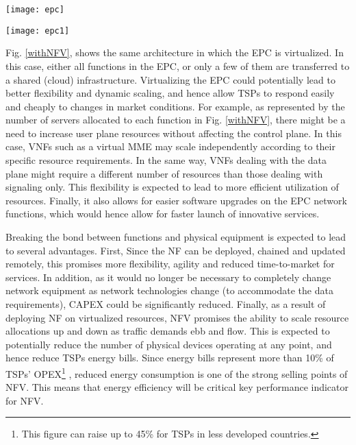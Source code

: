 \documentclass[conference]{IEEEtran}
\begin{document}
 \begin{figure*}[t]
\begin{minipage}{.50\textwidth}
\centering
\resizebox{.95\textwidth}{!}
{\texttt{[image: epc]}}
  \caption{Traditional \ac{LTE} \ac{EPC}}
  \label{current}
\end{minipage}
\begin{minipage}{.50\textwidth}
\centering
\resizebox{.95\textwidth}{!}
{\texttt{[image: epc1]}}
  \caption{Possible Virtualized \ac{EPC} Implementation}
  \label{withNFV}
\end{minipage}
\end{figure*}

Fig. \ref{withNFV}, shows the same architecture in which the \ac{EPC} is virtualized. In this case, either all functions in the EPC, or only a few of them are transferred to a shared (cloud) infrastructure. Virtualizing the \ac{EPC} could potentially lead to better flexibility and dynamic scaling, and hence allow \acp{TSP} to respond easily and cheaply to changes in market conditions. For example, as represented by the number of servers allocated to each function in Fig. \ref{withNFV}, there might be a need to increase user plane resources without affecting the control plane. In this case, \acp{VNF} such as a virtual MME may scale independently according to their specific resource requirements. In the same way, \acp{VNF} dealing with the data plane might require a different number of resources than those dealing with signaling only. This flexibility is expected to lead to more efficient utilization of resources. Finally, it also allows for easier software upgrades on the \ac{EPC} network functions, which would hence allow for faster launch of innovative services.



Breaking the bond between functions and physical equipment is expected to lead to several advantages. First, Since the \ac{NF} can be deployed, chained and updated remotely, this promises more flexibility, agility and reduced time-to-market for services. In addition, as it would no longer be necessary to completely change network equipment as network technologies change (to accommodate the data requirements), \ac{CAPEX} could be significantly reduced. Finally, as a result of deploying \ac{NF} on virtualized resources, \ac{NFV} promises the ability to scale resource allocations up and down as traffic demands ebb and flow. This is expected to potentially reduce the number of physical devices operating at any point, and hence reduce \acp{TSP} energy bills. Since energy bills represent more than 10\% of \acp{TSP}' \ac{OPEX}\footnote{This figure can raise up to 45\% for \acp{TSP} in less developed countries\cite{GWATT}.} \cite{GWATT}, reduced energy consumption is one of the strong selling points of NFV. This means that energy efficiency will be critical key performance indicator for NFV.
\end{document}
